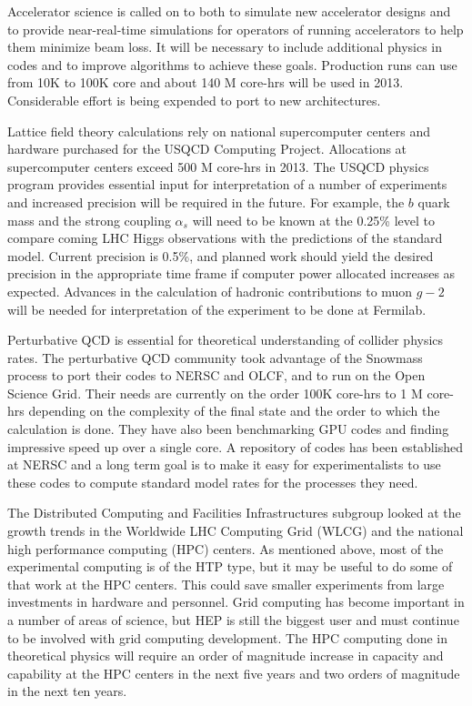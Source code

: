 Accelerator science is called on to both to simulate new accelerator designs and to provide near-real-time simulations for operators of running accelerators to help them minimize beam loss. It will be necessary to include additional physics in codes and to improve algorithms to achieve these goals. Production runs can use from 10K to 100K core and about 140 M core-hrs will be used in 2013.  Considerable effort is being expended to port to new architectures.

Lattice field theory calculations rely on national supercomputer centers and hardware purchased for the USQCD Computing Project. Allocations at supercomputer centers exceed 500 M core-hrs in 2013. The USQCD physics program provides essential input for interpretation of a number of experiments and increased precision will be required in the future.  For example, the $b$ quark mass and the strong coupling $\alpha_s$ will need to be known at the 0.25\% level to compare coming LHC Higgs observations with the predictions of the standard model.  Current precision is 0.5\%, and planned work should yield the desired precision in the appropriate time frame if computer power allocated increases as expected. Advances in the calculation of hadronic contributions to muon $g-2$ will be needed for interpretation of the experiment to be done at Fermilab.

Perturbative QCD is essential for theoretical understanding of collider physics rates. The perturbative QCD community took advantage of the Snowmass process to port their codes to NERSC and OLCF, and to run on the Open Science Grid. Their needs are currently on the order 100K core-hrs to 1 M core-hrs depending on the complexity of the final state and the order to which the calculation is done.  They have also been benchmarking GPU codes and finding impressive speed up over a single core.  A repository of codes has been established at NERSC and a long term goal is to make it easy for experimentalists to use these codes to compute standard model rates for the processes they need.

The Distributed Computing and Facilities Infrastructures subgroup looked at the growth trends in the Worldwide LHC Computing Grid (WLCG) and the national high performance computing (HPC) centers.  As mentioned above, most of the experimental computing is of the HTP type, but it may be useful to do some of that work at the HPC centers.  This could save smaller experiments from large investments in hardware and personnel.  Grid computing has become important in a number of areas of science, but HEP is still the biggest user and must continue to be involved with grid computing development.  The HPC computing done in theoretical physics will require an order of magnitude increase in capacity and capability at the HPC centers in the next five years and two orders of magnitude in the next ten years.

